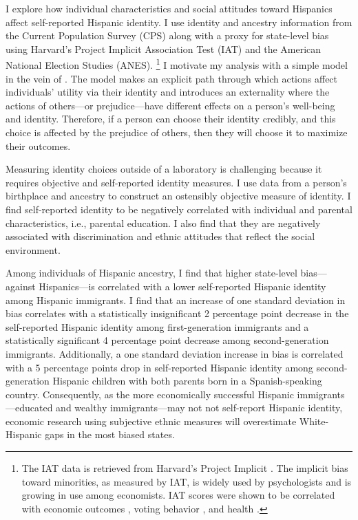 \documentclass[12pt,english]{article}
\begin{document}
I explore how individual characteristics and social attitudes toward Hispanics affect self-reported Hispanic identity. I use identity and ancestry information from the Current Population Survey (CPS) along with a proxy for state-level bias using Harvard's Project Implicit Association Test (IAT) and the American National Election Studies (ANES). \footnote{The IAT data is retrieved from Harvard's Project Implicit \autocite{greenwaldMeasuringIndividualDifferences1998}. The implicit bias toward minorities, as measured by IAT, is widely used by psychologists and is growing in use among economists. IAT scores were shown to be correlated with economic outcomes \autocite{chettyRaceEconomicOpportunity2020,gloverDiscriminationSelfFulfillingProphecy2017}, voting behavior \autocite{friesePredictingVotingBehavior2007}, and health \autocite{leitnerRacialBiasAssociated2016}.} I motivate my analysis with a simple model in the vein of \textcite{akerlofEconomicsIdentity2000}. The model makes an explicit path through which actions affect individuals' utility via their identity and introduces an externality where the actions of others---or prejudice---have different effects on a person's well-being and identity. Therefore, if a person can choose their identity credibly, and this choice is affected by the prejudice of others, then they will choose it to maximize their outcomes.

Measuring identity choices outside of a laboratory is challenging because it requires objective and self-reported identity measures. I use data from a person's birthplace and ancestry to construct an ostensibly objective measure of identity. I find self-reported identity to be negatively correlated with individual and parental characteristics, i.e., parental education. I also find that they are negatively associated with discrimination and ethnic attitudes that reflect the social environment. 

Among individuals of Hispanic ancestry, I find that higher state-level bias---against Hispanics---is correlated with a lower self-reported Hispanic identity among Hispanic immigrants. I find that an increase of one standard deviation in bias correlates with a statistically insignificant 2 percentage point decrease in the self-reported Hispanic identity among first-generation immigrants and a statistically significant 4 percentage point decrease among second-generation immigrants. Additionally, a one standard deviation increase in bias is correlated with a 5 percentage points drop in self-reported Hispanic identity among second-generation Hispanic children with both parents born in a Spanish-speaking country. Consequently, as the more economically successful Hispanic immigrants---educated and wealthy immigrants---may not not self-report Hispanic identity, economic research using subjective ethnic measures will overestimate White-Hispanic gaps in the most biased states. 
\end{document}
